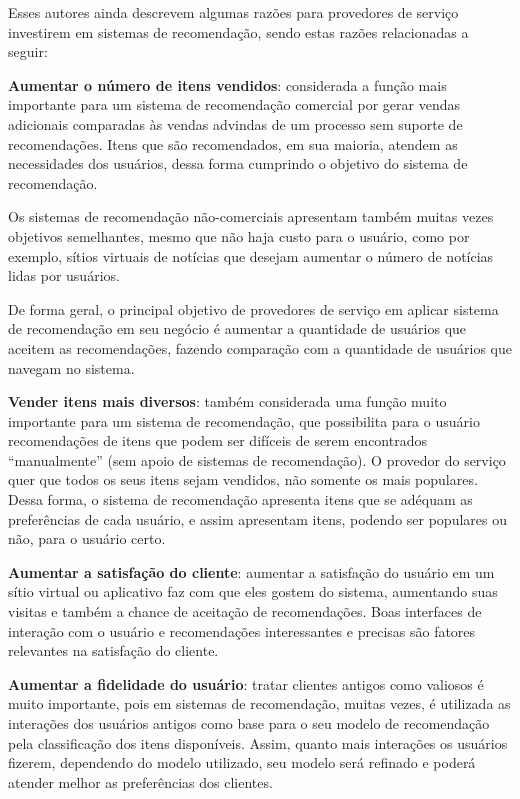 Esses autores ainda descrevem algumas razões para provedores de serviço investirem em sistemas de recomendação, sendo estas razões relacionadas a seguir:

\textbf{Aumentar o número de itens vendidos}: considerada a função mais importante para um sistema de recomendação comercial por gerar vendas adicionais comparadas às vendas advindas de um processo sem suporte de recomendações. Itens que são recomendados, em sua maioria, atendem as necessidades dos usuários, dessa forma cumprindo o objetivo do sistema de recomendação.

Os sistemas de recomendação não-comerciais apresentam também muitas vezes objetivos semelhantes, mesmo que não haja custo para o usuário, como por exemplo, sítios virtuais de notícias que desejam aumentar o número de notícias lidas por usuários.

De forma geral, o principal objetivo de provedores de serviço em aplicar sistema de recomendação em seu negócio é aumentar a quantidade de usuários que aceitem as recomendações, fazendo comparação com a quantidade de usuários que navegam no sistema.

\textbf{Vender itens mais diversos}: também considerada uma função muito importante para um sistema de recomendação, que possibilita para o usuário recomendações de itens que podem ser difíceis de serem encontrados “manualmente” (sem apoio de sistemas de recomendação). O provedor do serviço quer que todos os seus itens sejam vendidos, não somente os mais populares. Dessa forma, o sistema de recomendação apresenta itens que se adéquam as preferências de cada usuário, e assim apresentam itens, podendo ser populares ou não, para o usuário certo.

\textbf{Aumentar a satisfação do cliente}: aumentar a satisfação do usuário em um sítio virtual ou aplicativo faz com que eles gostem do sistema, aumentando suas visitas e também a chance de aceitação de recomendações. Boas interfaces de interação com o usuário e recomendações interessantes e precisas são fatores relevantes na satisfação do cliente.

\textbf{Aumentar a fidelidade do usuário}: tratar clientes antigos como valiosos é muito importante, pois em sistemas de recomendação, muitas vezes, é utilizada as interações dos usuários antigos como base para o seu modelo de recomendação pela classificação dos itens disponíveis. Assim, quanto mais interações os usuários fizerem, dependendo do modelo utilizado, seu modelo será refinado e poderá atender melhor as preferências dos clientes.

